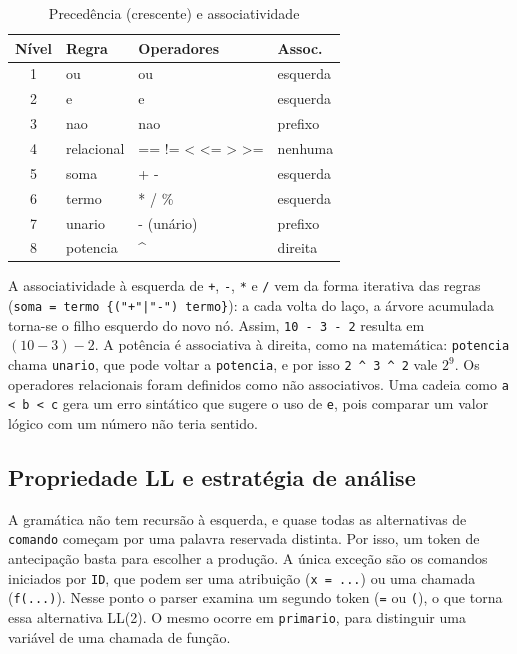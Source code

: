 \documentclass[conference]{IEEEtran}
\begin{document}
\begin{table}[!t]
\caption{Precedência (crescente) e associatividade}\label{tab:prec}
\centering\footnotesize
\begin{tabular}{@{}c l >{\ttfamily}l l@{}}
\toprule
\textbf{Nível} & \textbf{Regra} & \normalfont\textbf{Operadores} & \textbf{Assoc.} \\
\midrule
1 & ou         & ou                & esquerda \\
2 & e          & e                 & esquerda \\
3 & nao        & nao               & prefixo \\
4 & relacional & == != < <= > >=   & nenhuma \\
5 & soma       & + -               & esquerda \\
6 & termo      & * / \%            & esquerda \\
7 & unario     & - (unário)        & prefixo \\
8 & potencia   & \^{}              & direita \\
\bottomrule
\end{tabular}
\end{table}

A associatividade à esquerda de \texttt{+}, \texttt{-}, \texttt{*} e
\texttt{/} vem da forma iterativa das regras (\texttt{soma = termo \{("+"|"-")
termo\}}): a cada volta do laço, a árvore acumulada torna-se o filho esquerdo
do novo nó. Assim, \texttt{10 - 3 - 2} resulta em $(10-3)-2$. A potência
é associativa à direita, como na matemática: \texttt{potencia} chama
\texttt{unario}, que pode voltar a \texttt{potencia}, e por isso
\texttt{2 \^{} 3 \^{} 2} vale $2^{9}$. Os operadores relacionais foram
definidos como não associativos. Uma cadeia como \texttt{a < b < c} gera um
erro sintático que sugere o uso de \texttt{e}, pois comparar um valor lógico
com um número não teria sentido.

\subsection{Propriedade LL e estratégia de análise}
A gramática não tem recursão à esquerda, e quase todas as alternativas de
\texttt{comando} começam por uma palavra reservada distinta. Por isso, um
token de antecipação basta para escolher a produção. A única exceção são os
comandos iniciados por \texttt{ID}, que podem ser uma atribuição
(\texttt{x = ...}) ou uma chamada (\texttt{f(...)}). Nesse ponto o parser
examina um segundo token (\texttt{=} ou \texttt{(}), o que torna essa
alternativa LL(2). O mesmo ocorre em \texttt{primario}, para distinguir uma
variável de uma chamada de função.
\end{document}
